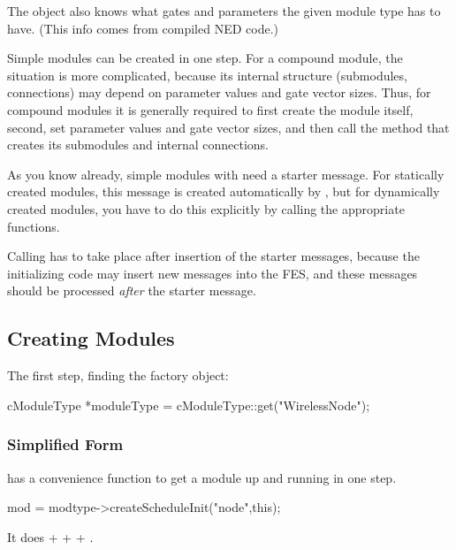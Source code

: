The  object also knows what gates and
parameters the given module type has to have. (This info comes from
compiled NED code.)

Simple modules can be created in one step. For a compound module, the
situation is more complicated, because its internal structure
(submodules, connections) may depend on parameter values and gate
vector sizes. Thus, for compound modules it is generally required to
first create the module itself, second, set parameter values and gate
vector sizes, and then call the method that creates its submodules and
internal connections.

As you know already, simple modules with  need a
starter message. For statically created
modules, this message is created automatically by {\opp}, but for
dynamically created modules, you have to do this explicitly by calling
the appropriate functions.

Calling  has to take place after insertion of the
starter messages, because the initializing code may insert new messages
into the FES, and these messages should be processed
\textit{after} the starter message.

%
%


\subsection{Creating Modules}

The first step, finding the factory object:

\begin{cpp}
cModuleType *moduleType = cModuleType::get("WirelessNode");
\end{cpp}


\subsubsection{Simplified Form}

 has a
convenience function to get a module up and running in one step.

\begin{cpp}
mod = modtype->createScheduleInit("node",this);
\end{cpp}

It does  +  +
 + .

